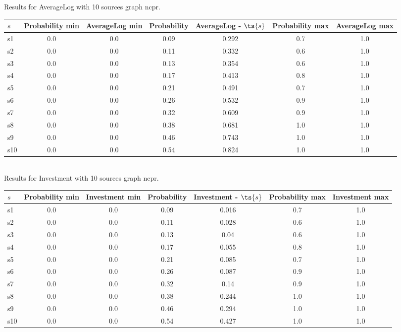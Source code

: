 \documentclass{article}
\begin{document}
\noindent Results for AverageLog with 10 sources graph ncpr.

\noindent\begin{tabular}{|l|c|c|c|c|c|c|}
\hline
$s$& Probability min & AverageLog min & Probability & AverageLog - $\ts{s}$ & Probability max & AverageLog max\\
\hline
s1 &0.0 & 0.0 & 0.09 & 0.292 & 0.7 & 1.0\\
\hline
s2 &0.0 & 0.0 & 0.11 & 0.332 & 0.6 & 1.0\\
\hline
s3 &0.0 & 0.0 & 0.13 & 0.354 & 0.6 & 1.0\\
\hline
s4 &0.0 & 0.0 & 0.17 & 0.413 & 0.8 & 1.0\\
\hline
s5 &0.0 & 0.0 & 0.21 & 0.491 & 0.7 & 1.0\\
\hline
s6 &0.0 & 0.0 & 0.26 & 0.532 & 0.9 & 1.0\\
\hline
s7 &0.0 & 0.0 & 0.32 & 0.609 & 0.9 & 1.0\\
\hline
s8 &0.0 & 0.0 & 0.38 & 0.681 & 1.0 & 1.0\\
\hline
s9 &0.0 & 0.0 & 0.46 & 0.743 & 1.0 & 1.0\\
\hline
s10 &0.0 & 0.0 & 0.54 & 0.824 & 1.0 & 1.0\\
\hline
\end{tabular}\\

\noindent Results for Investment with 10 sources graph ncpr.

\noindent\begin{tabular}{|l|c|c|c|c|c|c|}
\hline
$s$& Probability min & Investment min & Probability & Investment - $\ts{s}$ & Probability max & Investment max\\
\hline
s1 &0.0 & 0.0 & 0.09 & 0.016 & 0.7 & 1.0\\
\hline
s2 &0.0 & 0.0 & 0.11 & 0.028 & 0.6 & 1.0\\
\hline
s3 &0.0 & 0.0 & 0.13 & 0.04 & 0.6 & 1.0\\
\hline
s4 &0.0 & 0.0 & 0.17 & 0.055 & 0.8 & 1.0\\
\hline
s5 &0.0 & 0.0 & 0.21 & 0.085 & 0.7 & 1.0\\
\hline
s6 &0.0 & 0.0 & 0.26 & 0.087 & 0.9 & 1.0\\
\hline
s7 &0.0 & 0.0 & 0.32 & 0.14 & 0.9 & 1.0\\
\hline
s8 &0.0 & 0.0 & 0.38 & 0.244 & 1.0 & 1.0\\
\hline
s9 &0.0 & 0.0 & 0.46 & 0.294 & 1.0 & 1.0\\
\hline
s10 &0.0 & 0.0 & 0.54 & 0.427 & 1.0 & 1.0\\
\hline
\end{tabular}\\
\end{document}
